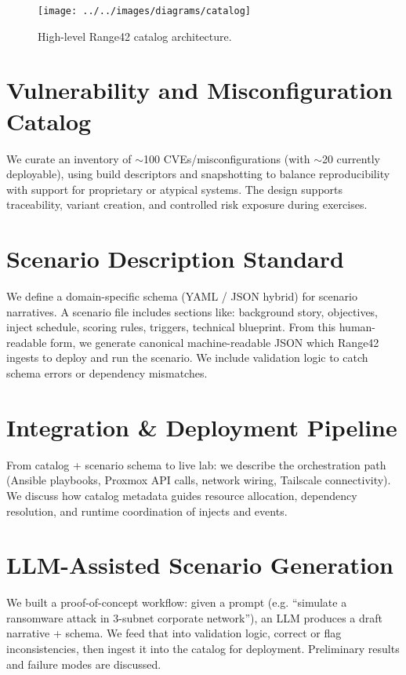 \documentclass[11pt]{article}
\begin{document}
\begin{figure}[h]
\centering
\texttt{[image: ../../images/diagrams/catalog]}
\caption{High-level Range42 catalog architecture.}
\label{fig:arch_catalog}
\end{figure}

\section{Vulnerability and Misconfiguration Catalog}
We curate an inventory of $\sim$100 CVEs/misconfigurations (with $\sim$20 currently deployable), using build descriptors and snapshotting to balance reproducibility with support for proprietary or atypical systems. The design supports traceability, variant creation, and controlled risk exposure during exercises.

\section{Scenario Description Standard}
We define a domain-specific schema (YAML / JSON hybrid) for scenario narratives. A scenario file includes sections like: background story, objectives, inject schedule, scoring rules, triggers, technical blueprint. From this human-readable form, we generate canonical machine-readable JSON which Range42 ingests to deploy and run the scenario. We include validation logic to catch schema errors or dependency mismatches.

\section{Integration \& Deployment Pipeline}
From catalog + scenario schema to live lab: we describe the orchestration path (Ansible playbooks, Proxmox API calls, network wiring, Tailscale connectivity). We discuss how catalog metadata guides resource allocation, dependency resolution, and runtime coordination of injects and events.

\section{LLM-Assisted Scenario Generation}
We built a proof-of-concept workflow: given a prompt (e.g. “simulate a ransomware attack in 3-subnet corporate network”), an LLM produces a draft narrative + schema. We feed that into validation logic, correct or flag inconsistencies, then ingest it into the catalog for deployment. Preliminary results and failure modes are discussed.
\end{document}
